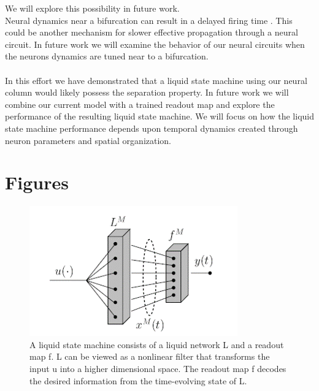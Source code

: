 \documentclass[a4paper,11pt]{article}
\begin{document}
We will explore this possibility in future work.
\\
Neural dynamics near a bifurcation can result in a delayed firing time \cite{izhikevich}.
This could be another mechanism for slower effective propagation through a neural circuit.
In future work we will examine the behavior of our neural circuits when the neurons dynamics are tuned near to a bifurcation.
\\ \\
In this effort we have demonstrated that a liquid state machine using our neural column would likely possess the separation property.
In future work we will combine our current model with a trained readout map and explore the performance of the resulting liquid state machine.
We will focus on how the liquid state machine performance depends upon temporal dynamics created through neuron parameters and spatial organization.

\section{Figures}
\begin{figure}[p]
 \caption{A liquid state machine consists of a liquid network L and a readout map f. L can be viewed as a nonlinear filter that transforms the input u into a higher dimensional space. The readout map f decodes the desired information from the time-evolving state of L.\cite{maas2002}}
 \label{fig:lsm_structure}
 \centering
   \includegraphics[width=\textwidth]{fig/lsm}
\end{figure}
\end{document}
